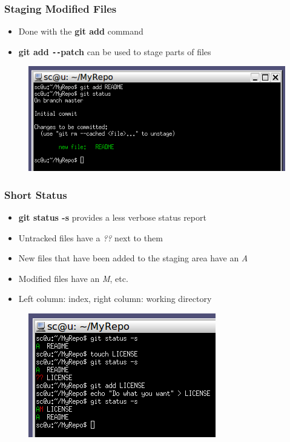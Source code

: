 \documentclass{beamer}
\begin{document}
\begin{frame}
	\frametitle{Staging Modified Files}
	\begin{itemize}
		\item{Done with the \textbf{git add} command}
		\item{\textbf{git add \texttt{-{}-}patch} can be used to stage parts of files}
	\end{itemize}
	\begin{figure}
		\includegraphics[scale=0.60]{Staging_Modified_Files-1.png}
	\end{figure}
\end{frame}

\begin{frame}
	\frametitle{Short Status}
	\begin{itemize}
		\item{\textbf{git status -s} provides a less verbose status report}
		\item{Untracked files have a \textit{??} next to them}
		\item{New files that have been added to the staging area have an \textit{A}}
		\item{Modified files have an \textit{M}, etc.}
		\item{Left column: index, right column: working directory}
	\end{itemize}
	\begin{figure}
		\includegraphics[scale=0.63]{Short_Status-0.png}
	\end{figure}
\end{frame}
\end{document}
